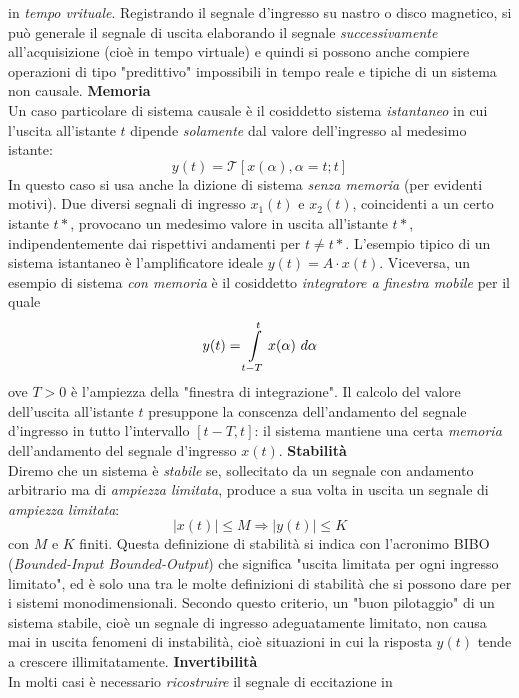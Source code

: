 \documentclass[12pt,oneside,openany]{memoir}
\numberwithin{equation}{subsection}
\begin{document}
in \textit{tempo vrituale}. Registrando il segnale d'ingresso su nastro o disco
magnetico, si pu\`o generale il segnale di uscita elaborando il segnale
\textit{successivamente} all'acquisizione (cio\`e in tempo virtuale) e quindi si
possono anche compiere operazioni di tipo "predittivo" impossibili in tempo
reale e tipiche di un sistema non causale.
\bigbreak
\noindent
\textbf{Memoria}\\
Un caso particolare di sistema causale \`e il cosiddetto sistema
\textit{istantaneo} in cui l'uscita all'istante $t$ dipende \textit{solamente}
dal valore dell'ingresso al medesimo istante:
\[
    y(t) = \mathcal{T}[x(\alpha), \alpha = t; t]
\]
In questo caso si usa anche la dizione di sistema \textit{senza memoria} (per
evidenti motivi). Due diversi segnali di ingresso $x_1(t)$ e $x_2(t)$,
coincidenti a un certo istante $t*$, provocano un medesimo valore in uscita
all'istante $t*$, indipendentemente dai rispettivi andamenti per $t \neq t*$.
L'esempio tipico di un sistema istantaneo \`e l'amplificatore ideale
$y(t) = A \cdot x(t)$. Viceversa, un esempio di sistema \textit{con memoria}
\`e il cosiddetto \textit{integratore a finestra mobile} per il quale
\[
    y(t) = \int\displaylimits_{t - T}^{t} x(\alpha) \ d\alpha
\]
ove $T > 0$ \`e l'ampiezza della "finestra di integrazione". Il calcolo del
valore dell'uscita all'istante $t$ presuppone la conscenza dell'andamento del
segnale d'ingresso in tutto l'intervallo $[t - T, t]$: il sistema mantiene
una certa \textit{memoria} dell'andamento del segnale d'ingresso $x(t)$.
\bigbreak
\noindent
\textbf{Stabilit\`a}\\
Diremo che un sistema \`e \textit{stabile} se, sollecitato da un segnale con
andamento arbitrario ma di \textit{ampiezza limitata}, produce a sua volta in
uscita un segnale di \textit{ampiezza limitata}:
\[
    |x(t)| \leq M \Rightarrow |y(t)| \leq K
\]
con $M$ e $K$ finiti. Questa definizione di stabilit\`a si indica con l'acronimo
BIBO (\textit{Bounded-Input Bounded-Output}) che significa "uscita limitata per
ogni ingresso limitato", ed \`e solo una tra le molte definizioni di stabilit\`a
che si possono dare per i sistemi monodimensionali. Secondo questo criterio, un
"buon pilotaggio" di un sistema stabile, cio\`e un segnale di ingresso
adeguatamente limitato, non causa mai in uscita fenomeni di instabilit\`a,
cio\`e situazioni in cui la risposta $y(t)$ tende a crescere illimitatamente.
\bigbreak
\noindent
\textbf{Invertibilit\`a}\\
In molti casi \`e necessario \textit{ricostruire} il segnale di eccitazione in
\end{document}
